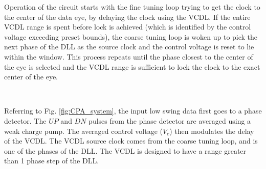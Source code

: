\documentclass[journal,twoside,letterpaper]{IEEEtran}
\begin{document}
Operation of the circuit starts
with the fine tuning loop trying to get the clock
to the center of the data eye, by delaying the clock using the
VCDL.
If the entire VCDL range is spent before lock is achieved (which
is identified by the control voltage exceeding preset bounds),
the coarse tuning loop is woken up
to pick the next phase of the DLL as the source clock
and the control voltage is reset to lie within the window.
This process repeats until the phase closest to the center
of the eye is selected and the VCDL range is sufficient
to lock the clock to the exact center of the eye.
\begin{figure*}
\centering
{}
\\
\centering
{}
\caption{(a) Block diagram clock synchronizer system, divided
into fine tuning and coarse tuning loops.
\mbox{VCDL - voltage controlled delay line},
\mbox{$Vc$ - control voltage}, and (b) Schematic of the UP DOWN ring counter used in the synchronizer.}
\label{fig:CPA_system}
\end{figure*}
Referring to Fig. \ref{fig:CPA_system},
the input low swing data first goes to a phase detector.
The $UP$ and $DN$ pulses from the phase detector
are averaged using a weak charge pump.
The averaged control voltage ($V_c$)
then modulates the delay of the VCDL.
The VCDL source clock comes from the coarse tuning loop, 
and is one of the phases of the DLL.
The VCDL is designed to have a range greater than 1 phase step of the DLL.
 
\end{document}
